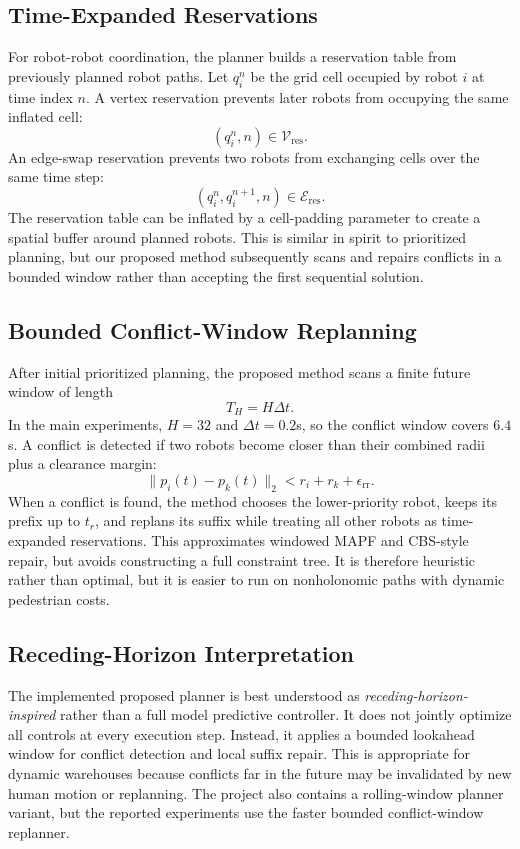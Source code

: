\documentclass[10pt,twocolumn,letterpaper]{article}
\begin{document}
\subsection{Time-Expanded Reservations}
For robot-robot coordination, the planner builds a reservation table from previously planned robot paths. Let $q_i^n$ be the grid cell occupied by robot $i$ at time index $n$. A vertex reservation prevents later robots from occupying the same inflated cell:
\begin{equation}
    (q_i^n, n) \in \mathcal{V}_{\mathrm{res}}.
\end{equation}
An edge-swap reservation prevents two robots from exchanging cells over the same time step:
\begin{equation}
    (q_i^n, q_i^{n+1}, n) \in \mathcal{E}_{\mathrm{res}}.
\end{equation}
The reservation table can be inflated by a cell-padding parameter to create a spatial buffer around planned robots. This is similar in spirit to prioritized planning, but our proposed method subsequently scans and repairs conflicts in a bounded window rather than accepting the first sequential solution.

\subsection{Bounded Conflict-Window Replanning}
After initial prioritized planning, the proposed method scans a finite future window of length
\begin{equation}
    T_H = H\Delta t.
\end{equation}
In the main experiments, $H=32$ and $\Delta t=0.2$s, so the conflict window covers $6.4$s. A conflict is detected if two robots become closer than their combined radii plus a clearance margin:
\begin{equation}
    \|p_i(t)-p_k(t)\|_2
    < r_i + r_k + \epsilon_{\mathrm{rr}}.
\end{equation}
When a conflict is found, the method chooses the lower-priority robot, keeps its prefix up to $t_r$, and replans its suffix while treating all other robots as time-expanded reservations. This approximates windowed MAPF and CBS-style repair, but avoids constructing a full constraint tree. It is therefore heuristic rather than optimal, but it is easier to run on nonholonomic paths with dynamic pedestrian costs.

\subsection{Receding-Horizon Interpretation}
The implemented proposed planner is best understood as \emph{receding-horizon-inspired} rather than a full model predictive controller. It does not jointly optimize all controls at every execution step. Instead, it applies a bounded lookahead window for conflict detection and local suffix repair. This is appropriate for dynamic warehouses because conflicts far in the future may be invalidated by new human motion or replanning. The project also contains a rolling-window planner variant, but the reported experiments use the faster bounded conflict-window replanner.
\end{document}
